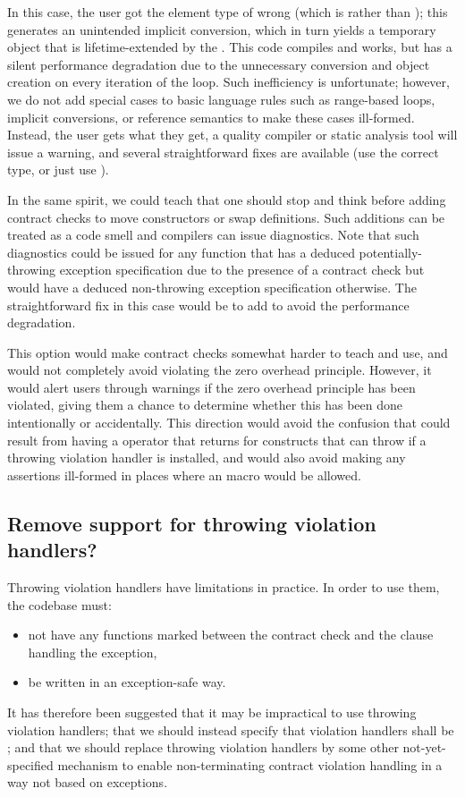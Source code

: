 In this case, the user got the element type of  wrong (which is  rather than ); this generates an unintended implicit conversion, which in turn yields a temporary object that is lifetime-extended by the . This code compiles and works, but has a silent performance degradation due to the unnecessary conversion and object creation on every iteration of the loop. Such inefficiency is unfortunate; however, we do not add special cases to basic language rules such as range-based  loops, implicit conversions, or reference semantics to make these cases ill-formed. Instead, the user gets what they get, a quality compiler or static analysis tool will issue a warning, and several straightforward fixes are available (use the correct type, or just use ).

In the same spirit, we could teach that one should stop and think before adding contract checks to move constructors or swap definitions. Such additions can be treated as a code smell and compilers can issue diagnostics. Note that such diagnostics could be issued for any function that has a deduced potentially-throwing exception specification due to the presence of a contract check but would have a deduced non-throwing exception specification otherwise. The straightforward fix in this case would be to add  to avoid the performance degradation.

This option would make contract checks somewhat harder to teach and use, and would not completely avoid violating the zero overhead principle. However, it would alert users through warnings if the zero overhead principle has been violated, giving them a chance to determine whether this has been done intentionally or accidentally. This direction would avoid the confusion that could result from having a  operator that returns  for constructs that can throw if a throwing violation handler is installed, and would also avoid making any assertions ill-formed in places where an  macro would be allowed.


\subsection{Remove support for throwing violation handlers?}

Throwing violation handlers have limitations in practice. In order to use them, the codebase must:
\begin{itemize}
\item not have any functions marked  between the contract check and the  clause handling the exception,
\item be written in an exception-safe way.
\end{itemize}
It has therefore been suggested that it may be impractical to use throwing violation handlers; that we should instead specify that violation handlers shall be ; and that we should replace throwing violation handlers by some other not-yet-specified mechanism to enable non-terminating contract violation handling in a way not based on exceptions.

